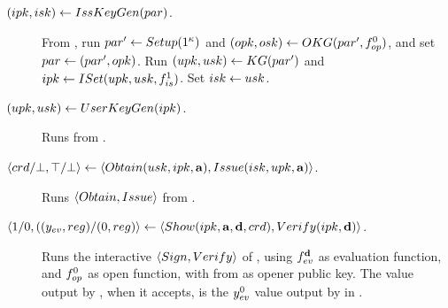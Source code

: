 \begin{description}
\item[$(ipk,isk) \gets IssKeyGen(par)$.] From \CUASGenInt, run $par'
  \gets Setup(1^\kappa)$ and $(opk,osk) \gets OKG(par',
  f_{op}^0)$, and set $par \gets (par',opk)$. Run $(upk,usk) \gets
  KG(par')$ and $ipk \gets ISet(upk,usk,f_{is}^1)$. Set $isk \gets
  usk$.
\item[$(upk,usk) \gets UserKeyGen(ipk)$.] Runs \KeyGen from \CUASGenInt.
\item[$\langle crd/\bot,\top/\bot \rangle \gets
  \langle Obtain(usk,ipk,\mathbf{a}),Issue(isk,upk,\mathbf{a}) \rangle$.]
  Runs $\langle Obtain,Issue \rangle$ from \CUASGenInt.
\item[$\langle 1/0,((y_{ev},reg)/(0,reg)\rangle
  \gets \langle Show(ipk,\mathbf{a},\mathbf{d},
  crd),Verify(ipk,\mathbf{d}) \rangle$.]
  Runs the interactive $\langle Sign, Verify\rangle$ of  \CUASGenInt,
  using $f_{ev}^{\mathbf{d}}$ as evaluation function, and $f_{op}^0$ as
  open function, with \opk from \parm as opener public key. The \yeval value
  output by \Verify, when it accepts, is the $y_{ev}^0$ value output by
  \Sign in \CUASGenInt.
\end{description}




